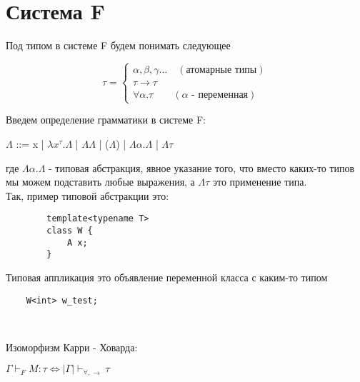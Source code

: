  	\section{Система F}
 	
\begin{definition}
	 	Под типом в системе F будем понимать следующее

 	
 	\begin{equation*}
 	\tau =
 	\begin{cases}
 	\alpha,\beta,\gamma ...\quad(\text{атомарные типы}) \\
 	\tau\rightarrow\tau \\
 	\forall\alpha.\tau\qquad(\alpha\text{ - переменная})
 	\end{cases}
 	\end{equation*}
 \end{definition}

 \begin{definition}
 		\large Введем определение грамматики в системе F:
 	\begin{center}
 		\large $\Lambda$ ::= x | $\lambda x^{\tau}.\Lambda$ | $\Lambda\Lambda$ | ($\Lambda$) | $\Lambda\alpha.\Lambda$ | $\Lambda\tau$ 
 	\end{center}
 \end{definition}
 	
 	где $\Lambda\alpha.\Lambda$ - типовая абстракция, явное указание того, что вместо каких-то типов мы можем подставить любые выражения, а $\Lambda\tau$ это применение типа. \\
 	
 	
 	Так, пример типовой абстракции это: 
 	\begin{verbatim}
 		template<typename T>
 		class W {
 		    A x;
 		}
 	\end{verbatim}
 	
 	Типовая аппликация это объявление переменной класса с каким-то типом
 	
 	\begin{verbatim}
 	W<int> w_test;
 	\end{verbatim}\
 	
 	\begin{theorem}
 		Изоморфизм Карри - Ховарда:
    \begin{center}
 		$\Gamma\vdash_F M:\tau\Leftrightarrow |\Gamma|\vdash_{\forall, \rightarrow}\tau$ 
    \end{center}
 	
 	\end{theorem}
 	
